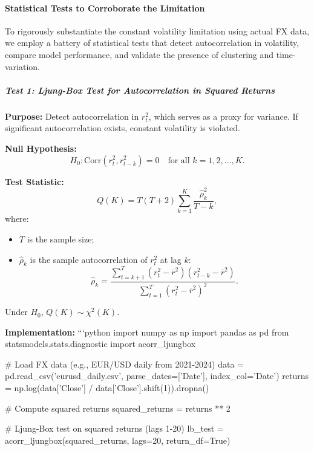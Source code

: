 \paragraph{Statistical Tests to Corroborate the Limitation}

To rigorously substantiate the constant volatility limitation using actual FX data, we employ a battery of statistical tests that detect autocorrelation in volatility, compare model performance, and validate the presence of clustering and time-variation.

\subparagraph{Test 1: Ljung-Box Test for Autocorrelation in Squared Returns}

\textbf{Purpose:} Detect autocorrelation in $r_t^2$, which serves as a proxy for variance. If significant autocorrelation exists, constant volatility is violated.

\textbf{Null Hypothesis:}
\begin{equation}
	H_0: \text{Corr}(r_t^2, r_{t-k}^2) = 0 \quad \text{for all } k = 1, 2, \ldots, K.
\end{equation}

\textbf{Test Statistic:}
\begin{equation}
	Q(K) = T(T+2) \sum_{k=1}^K \frac{\hat{\rho}_k^2}{T-k},
\end{equation}
where:
\begin{itemize}
	\item $T$ is the sample size;
	\item $\hat{\rho}_k$ is the sample autocorrelation of $r_t^2$ at lag $k$:
	\begin{equation}
		\hat{\rho}_k = \frac{\sum_{t=k+1}^T (r_t^2 - \bar{r}^2)(r_{t-k}^2 - \bar{r}^2)}{\sum_{t=1}^T (r_t^2 - \bar{r}^2)^2}.
	\end{equation}
\end{itemize}

Under $H_0$, $Q(K) \sim \chi^2(K)$.

\textbf{Implementation:}
```python
import numpy as np
import pandas as pd
from statsmodels.stats.diagnostic import acorr_ljungbox

# Load FX data (e.g., EUR/USD daily from 2021-2024)
data = pd.read_csv('eurusd_daily.csv', parse_dates=['Date'], index_col='Date')
returns = np.log(data['Close'] / data['Close'].shift(1)).dropna()

# Compute squared returns
squared_returns = returns ** 2

# Ljung-Box test on squared returns (lags 1-20)
lb_test = acorr_ljungbox(squared_returns, lags=20, return_df=True)

